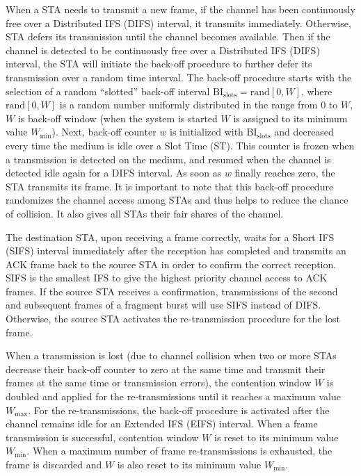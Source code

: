 \documentclass[journal,draftclsnofoot,12pt,onecolumn]{IEEEtran}
\begin{document}
When a STA needs to transmit a new frame, if the channel has been continuously free over a Distributed IFS (DIFS) interval, it transmits immediately. Otherwise, STA defers its transmission until the channel becomes available. Then if the channel is detected to be continuously free over a Distributed IFS (DIFS) interval, the STA will initiate the back-off procedure to further defer its transmission over a random time interval. The back-off procedure starts with the selection of a random ``slotted'' back-off interval $\mathrm{BI_{slots}} = \mathrm{rand}[0,W]$, where $\mathrm{rand}[0,W]$ is a random number uniformly distributed in the range from $0$ to $W$, $W$ is back-off window (when the system is started $W$ is assigned to its minimum value $W_{\min}$). Next, back-off counter $w$ is initialized with $\mathrm{BI_{slots}}$ and decreased every time the medium is idle over a Slot Time (ST). This counter is frozen when a transmission is detected on the medium, and resumed when the channel is detected idle again for a DIFS interval. As soon as $w$ finally reaches zero, the STA transmits its frame. It is important to note that this back-off procedure randomizes the channel access among STAs and thus helps to reduce the chance of collision. It also gives all STAs their fair shares of the channel.

The destination STA, upon receiving a frame correctly, waits for a Short IFS (SIFS) interval immediately after the reception has completed and transmits an ACK frame back to the source STA in order to confirm the correct reception. SIFS is the smallest IFS to give the highest priority channel access to ACK frames. If the source STA receives a confirmation, transmissions of the second and subsequent frames of a fragment burst will use SIFS instead of DIFS. Otherwise, the source STA activates the re-transmission procedure for the lost frame.

When a transmission is lost (due to channel collision when two or more STAs decrease their back-off counter to zero at the same time and transmit their frames at the same time or transmission errors), the contention window $W$ is doubled and applied for the re-transmissions until it reaches a maximum value $W_{\max}$. For the re-transmissions, the back-off procedure is activated after the channel remains idle for an Extended IFS (EIFS) interval. When a frame transmission is successful, contention window $W$ is reset to its minimum value $W_{\min}$. When a maximum number of frame re-transmissions is exhausted, the frame is discarded and $W$ is also reset to its minimum value $W_{\min}$.
\end{document}
